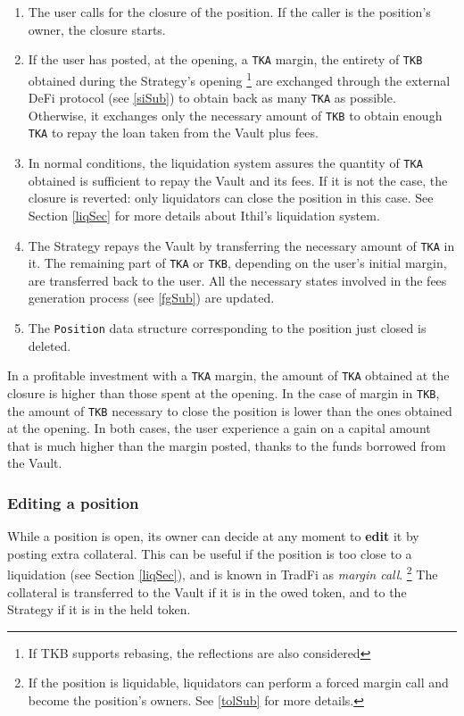 \documentclass[a4paper,10 pt]{article}
\theoremstyle{definition}
\begin{document}
\begin{enumerate}
\item The user calls for the closure of the position. If the caller is the position's owner, the closure starts.
\item If the user has posted, at the opening, a \verb|TKA| margin, the entirety of \verb|TKB| obtained during the Strategy's opening \footnote{If TKB supports rebasing, the reflections are also considered} are exchanged through the external DeFi protocol (see \ref{siSub}) to obtain back as many \verb|TKA| as possible. Otherwise, it exchanges only the necessary amount of \verb|TKB| to obtain enough \verb|TKA| to repay the loan taken from the Vault plus fees.
\item In normal conditions, the liquidation system assures the quantity of \verb|TKA| obtained is sufficient to repay the Vault and its fees. If it is not the case, the closure is reverted: only liquidators can close the position in this case. See Section \ref{liqSec} for more details about Ithil's liquidation system.
\item The Strategy repays the Vault by transferring the necessary amount of \verb|TKA| in it. The remaining part of \verb|TKA| or \verb|TKB|, depending on the user's initial margin, are transferred back to the user. All the necessary states involved in the fees generation process (see \ref{fgSub}) are updated.
\item The \verb|Position| data structure corresponding to the position just closed is deleted.
\end{enumerate}

In a profitable investment with a \verb|TKA| margin, the amount of \verb|TKA| obtained at the closure is higher than those spent at the opening. In the case of margin in \verb|TKB|, the amount of \verb|TKB| necessary to close the position is lower than the ones obtained at the opening. In both cases, the user experience a gain on a capital amount that is much higher than the margin posted, thanks to the funds borrowed from the Vault.

\subsubsection{Editing a position}\label{editSubSub}

While a position is open, its owner can decide at any moment to {\bf edit} it by posting extra collateral. This can be useful if the position is too close to a liquidation (see Section \ref{liqSec}), and is known in TradFi as {\it margin call}. \footnote{If the position is liquidable, liquidators can perform a forced margin call and become the position's owners. See \ref{tolSub} for more details.} The collateral is transferred to the Vault if it is in the owed token, and to the Strategy if it is in the held token.
\end{document}

